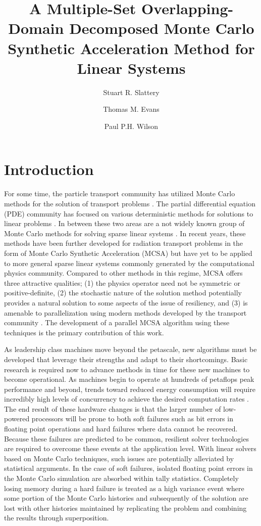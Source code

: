\documentclass{snamc2013}
\title{A Multiple-Set Overlapping-Domain Decomposed Monte Carlo
  Synthetic Acceleration Method for Linear Systems}
\author[1]{Stuart R. Slattery}
\author[2]{Thomas M. Evans}
\author[1]{Paul P.H. Wilson}
\affil[1]{University of Wisconsin - Madison, Engineering Physics
  Department, 1500 Engineering Dr., Madison, WI 53706}
\affil[2]{Oak Ridge National Laboratory, Reactor and Nuclear Systems
  Division, 1 Bethel Valley Rd., Oak Ridge, TN 37831}
\begin{document}
\section{Introduction}

For some time, the particle transport community has utilized Monte
Carlo methods for the solution of transport problems
\cite{lewis_computational_1993}. The partial differential equation
(PDE) community has focused on various deterministic methods for
solutions to linear problems \cite{saad_iterative_2003,
  kelley_iterative_1995}. In between these two areas are a not widely
known group of Monte Carlo methods for solving sparse linear systems
\cite{forsythe_matrix_1950, hammersley_monte_1964,
  halton_sequential_1962, halton_sequential_1994}. In recent years,
these methods have been further developed for radiation transport
problems in the form of Monte Carlo Synthetic Acceleration (MCSA)
\cite{evans_monte_2009, evans_monte_2012} but have yet to be applied
to more general sparse linear systems commonly generated by the
computational physics community. Compared to other methods in this
regime, MCSA offers three attractive qualities; (1) the physics
operator need not be symmetric or positive-definite, (2) the
stochastic nature of the solution method potentially provides a
natural solution to some aspects of the issue of resiliency, and (3)
is amenable to parallelization using modern methods developed by the
transport community \cite{wagner_hybrid_2010}. The development of a
parallel MCSA algorithm using these techniques is the primary
contribution of this work.

As leadership class machines move beyond the petascale, new algorithms
must be developed that leverage their strengths and adapt to their
shortcomings. Basic research is required now to advance methods in
time for these new machines to become operational. As machines begin
to operate at hundreds of petaflops peak performance and beyond,
trends toward reduced energy consumption will require incredibly high
levels of concurrency to achieve the desired computation rates
\cite{kogge_using_2011}. The end result of these hardware changes is
that the larger number of low-powered processors will be prone to both
soft failures such as bit errors in floating point operations and hard
failures where data cannot be recovered. Because these failures are
predicted to be common, resilient solver technologies are required to
overcome these events at the application level. With linear solvers
based on Monte Carlo techniques, such issues are potentially
alleviated by statistical arguments. In the case of soft failures,
isolated floating point errors in the Monte Carlo simulation are
absorbed within tally statistics. Completely losing memory during a
hard failure is treated as a high variance event where some portion of
the Monte Carlo histories and subsequently of the solution are lost
with other histories maintained by replicating the problem and
combining the results through superposition.
\end{document}
